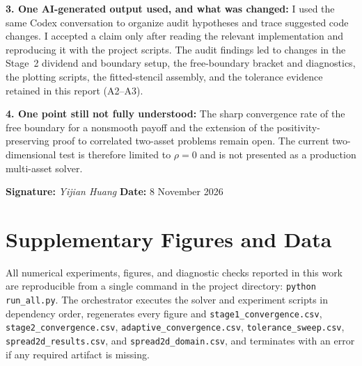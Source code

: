 \documentclass[11pt,a4paper]{article}
\theoremstyle{definition}
\theoremstyle{remark}
\begin{document}
\begin{formbox}
\textbf{3. One AI-generated output used, and what was changed:}
I used the same Codex conversation to organize audit hypotheses and trace
suggested code changes. I accepted a claim only after reading the relevant
implementation and reproducing it with the project scripts. The audit findings
led to changes in the Stage~2 dividend and boundary setup, the free-boundary
bracket and diagnostics, the plotting scripts, the fitted-stencil assembly,
and the tolerance evidence retained in this report (A2--A3).

\textbf{4. One point still not fully understood:}
The sharp convergence rate of the free boundary for a nonsmooth payoff and the
extension of the positivity-preserving proof to correlated two-asset problems
remain open. The current two-dimensional test is therefore limited to
$\rho=0$ and is not presented as a production multi-asset solver.

\textbf{Signature:} \textit{Yijian Huang} \quad
\textbf{Date:} 8 November 2026
\end{formbox}

\newpage
\section{Supplementary Figures and Data}
\label{app:validation}

All numerical experiments, figures, and diagnostic checks reported in this
work are reproducible from a single command in the project directory:
\texttt{python run\_all.py}. The orchestrator executes the solver and
experiment scripts in dependency order, regenerates every figure and
\texttt{stage1\_convergence.csv}, \texttt{stage2\_convergence.csv},
\texttt{adaptive\_convergence.csv}, \texttt{tolerance\_sweep.csv},
\texttt{spread2d\_results.csv}, and \texttt{spread2d\_domain.csv}, and
terminates with an error if any required artifact is missing.
\end{document}
